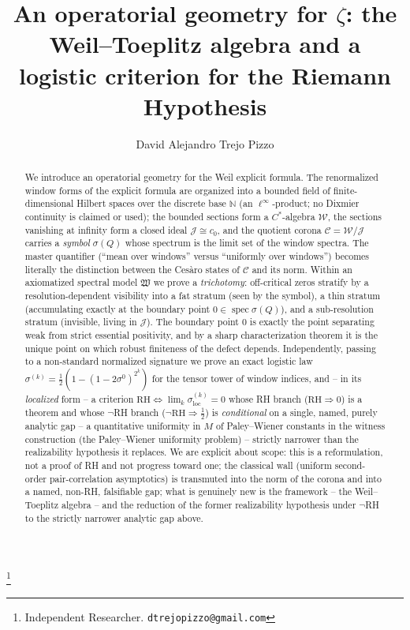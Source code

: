 \documentclass[11pt,reqno]{amsart}
\theoremstyle{definition}
\newcommand{\W}{\mathcal{W}}
\newcommand{\Jc}{\mathcal{J}}
\newcommand{\Cor}{\mathcal{C}}
\newcommand{\spec}{\operatorname{spec}}
\newcommand{\N}{\mathbb{N}}
\newcommand{\half}{\tfrac12}
\begin{document}
\title[An Operatorial Geometry for $\zeta$]{An operatorial geometry for $\zeta$: the Weil--Toeplitz algebra and a logistic criterion for the Riemann Hypothesis}

\author{David Alejandro Trejo Pizzo}
\thanks{Independent Researcher. \texttt{dtrejopizzo@gmail.com}}

\begin{abstract}
We introduce an operatorial geometry for the Weil explicit formula. The
renormalized window forms of the explicit formula are organized into a
bounded field of finite-dimensional Hilbert spaces over the discrete base
\(\N\) (an \(\ell^\infty\)-product; no Dixmier continuity is claimed or used);
the bounded sections
form a \(C^*\)-algebra \(\W\), the sections vanishing at infinity form a closed
ideal \(\Jc\cong c_0\), and the quotient corona \(\Cor=\W/\Jc\) carries a
\emph{symbol} \(\sigma(Q)\) whose spectrum is the limit set of the window
spectra. The master quantifier (``mean over windows'' versus
``uniformly over windows'') becomes literally the distinction between the
Ces\`aro states of \(\Cor\) and its norm. Within an axiomatized spectral model
\(\mathfrak W\) we prove a \emph{trichotomy}: off-critical zeros stratify by a
resolution-dependent visibility into a fat stratum (seen by the symbol), a thin
stratum (accumulating exactly at the boundary point \(0\in\spec\sigma(Q)\)), and
a sub-resolution stratum (invisible, living in \(\Jc\)). The boundary point
\(0\) is exactly the point separating weak from strict essential positivity, and
by a sharp characterization theorem it is the unique point on which robust
finiteness of the defect depends. Independently, passing to a non-standard
normalized signature we prove an exact logistic law
\(\sigma^{(k)}=\half(1-(1-2\sigma^0)^{2^k})\) for the tensor tower of window
indices, and -- in its \emph{localized} form -- a criterion
\(\mathrm{RH}\iff\lim_k\sigma_{\mathrm{loc}}^{(k)}=0\) whose RH branch
(\(\mathrm{RH}\Rightarrow0\)) is a theorem and whose \(\neg\)RH branch
(\(\neg\mathrm{RH}\Rightarrow\half\)) is \emph{conditional} on a single, named,
purely analytic gap -- a quantitative uniformity in \(M\) of Paley--Wiener
constants in the witness construction (the Paley--Wiener uniformity problem) -- strictly narrower than
the realizability hypothesis it replaces. We are explicit about scope: this is a
reformulation, not a proof of RH and not progress toward one; the classical
wall (uniform second-order pair-correlation asymptotics) is transmuted into the
norm of the corona and into a named, non-RH, falsifiable gap; what is genuinely
new is the framework -- the Weil--Toeplitz algebra -- and the reduction of the
former realizability hypothesis under \(\neg\)RH to the strictly narrower
analytic gap above.
\end{abstract}
\end{document}
